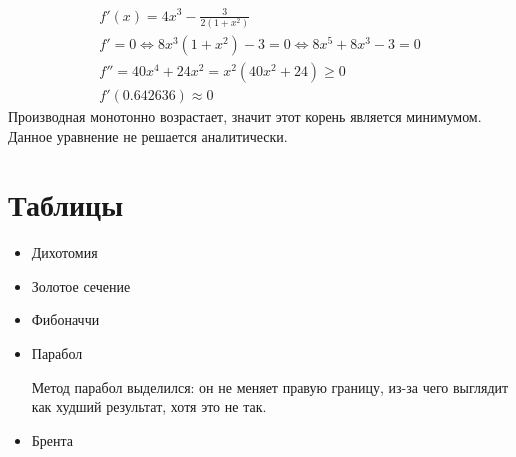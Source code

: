 \documentclass[russian, english]{article}
\begin{document}
\begin{gather*}
f'(x) = 4x^3 - \frac{3}{2(1+x^2)} \\
f' = 0 \Leftrightarrow 8x^3(1+x^2)-3 = 0 \Leftrightarrow 8x^5+8x^3-3=0 \\
f'' = 40x^4 + 24x^2 = x^2(40x^2 + 24) \ge 0 \\
f'(0.642636) \approx 0
\end{gather*}
Производная монотонно возрастает, значит этот корень является минимумом.
Данное уравнение не решается аналитически.

\section{Таблицы}

\def\makePlots#1#2{
	\addplot table [x={#2}, y={dichotomy}] {#1};
	\addlegendentry{Дихотомия}
	\addplot table [x={#2}, y={golden-section}] {#1};
	\addlegendentry{Золотое сечение}
	\addplot table [x={#2}, y={fibonacci}] {#1};
	\addlegendentry{Фибоначчи}
	\addplot table [x={#2}, y={parabolic}] {#1};
	\addlegendentry{Парабол}
	ожидаемо.\addplot table [x={#2}, y={brent}] {#1};
	\addlegendentry{Брента}
}

\begin{itemize}
\item \vbox{Дихотомия\newline{}}
\item \vbox{Золотое сечение\newline{}}
\item \vbox{Фибоначчи\newline{}}
\item \vbox{Парабол\newline{}}
	\par
	Метод парабол выделился: он не меняет правую границу, из-за чего выглядит как худший результат, хотя это не так.
\item \vbox{Брента\newline{}}
\end{itemize}

\end{document}
